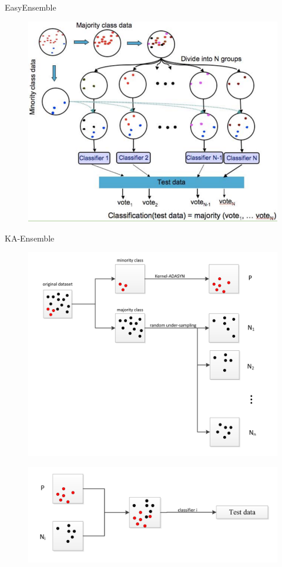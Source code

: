 \documentclass[10pt]{beamer}
\begin{document}
\begin{frame}{EasyEnsemble}
\begin{figure}[!ht]
\centering
  \includegraphics[width=0.8\linewidth]{easy}
\end{figure}
\end{frame}

\begin{frame}{KA-Ensemble}

\begin{figure}[!ht]
\centering
  \includegraphics[width=0.55\linewidth]{method}
\end{figure}

\begin{figure}[!ht]
\centering
  \includegraphics[width=0.55\linewidth]{method2}
\end{figure}
\end{frame}
\end{document}

